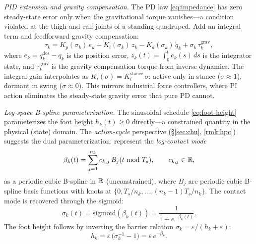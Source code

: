 \medskip\noindent\emph{PID extension and gravity compensation.}
The PD law \eqref{eq:impedance} has zero steady-state error only when the
gravitational torque vanishes---a condition violated at the thigh and calf
joints of a standing quadruped.
Add an integral term and feedforward gravity compensation:
\begin{equation}\label{eq:pid-impedance}
\tau_k = K_p(\sigma_k)\,e_k
       + K_i(\sigma_k)\,z_k
       - K_d(\sigma_k)\,\dot{q}_k
       + \sigma_k\,\tau_k^{\mathrm{grav}},
\end{equation}
where $e_k = q_k^{\mathrm{des}} - q_k$ is the position error,
$z_k(t) = \int_0^t e_k(s)\,ds$ is the integrator state, and
$\tau_k^{\mathrm{grav}}$ is the gravity compensation torque from inverse
dynamics.
The integral gain interpolates as
$K_i(\sigma) = K_i^{\mathrm{stance}}\,\sigma$: active only in stance
($\sigma \approx 1$), dormant in swing ($\sigma \approx 0$).
This mirrors industrial force controllers, where PI action eliminates
the steady-state gravity error that pure PD cannot.

\medskip\noindent\emph{Log-space B-spline parameterization.}
The sinusoidal schedule \eqref{eq:foot-height} parameterizes the foot height
$h_k(t) \geq 0$ directly---a constrained quantity in the physical (state) domain.
The \emph{action-cycle} perspective (\S\ref{sec:chu}, \cref{rmk:hpc}) suggests
the dual parameterization: represent the \emph{log-contact mode}
\begin{equation}\label{eq:log-contact}
  \beta_k(t) = \sum_{j=1}^{n_k} c_{k,j}\, B_j(t \bmod T_s),
  \qquad c_{k,j} \in \mathbb{R},
\end{equation}
as a periodic cubic B-spline in $\mathbb{R}$ (unconstrained), where $B_j$ are
periodic cubic B-spline basis functions with knots at
$\{0, T_s/n_k, \ldots, (n_k{-}1)T_s/n_k\}$.
The contact mode is recovered through the sigmoid:
\begin{equation}\label{eq:sigmoid-contact}
  \sigma_k(t) = \mathrm{sigmoid}(\beta_k(t))
  = \frac{1}{1 + e^{-\beta_k(t)}}.
\end{equation}
The foot height follows by inverting the barrier relation
$\sigma_k = \varepsilon/(h_k + \varepsilon)$:
\[
  h_k = \varepsilon\,\bigl(\sigma_k^{-1} - 1\bigr)
  = \varepsilon\, e^{-\beta_k}.
\]

